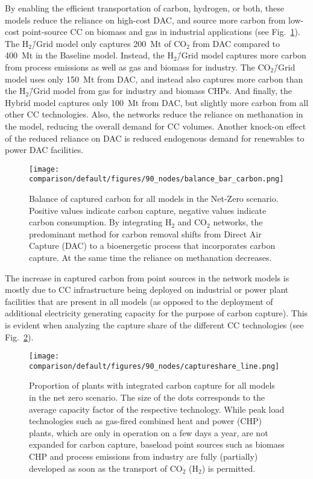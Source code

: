 \documentclass[twocolumn]{article}
\newcommand{\COtwo}{CO$_2$}
\newcommand{\Htwo}{H$_2$}
\newcommand{\modBase}{Baseline model}
\newcommand{\modCO}{CO$_2$\=/Grid model}
\newcommand{\modH}{H$_2$\=/Grid model}
\newcommand{\modHybrid}{Hybrid model}
\begin{document}
By enabling the efficient transportation of carbon, hydrogen, or both, these models reduce the reliance on high-cost DAC, and source more carbon from low-cost point-source CC on biomass and gas in industrial applications (see Fig.~\ref{fig:balance_captured_carbon}). The \modH{} only captures \label{}200~Mt of \COtwo{} from DAC compared to \label{}400~Mt in the \modBase{}. Instead, the \modH{} captures more carbon from process emissions as well as gas and biomass for industry. The \modCO{} uses only \label{}150~Mt from DAC, and instead also captures more carbon than the \modH{} from gas for industry and biomass CHPs. And finally, the \modHybrid{} captures only \label{}100~Mt from DAC, but slightly more carbon from all other CC technologies.
Also, the networks reduce the reliance on methanation in the model, reducing the overall demand for CC volumes. Another knock-on effect of the reduced reliance on DAC is reduced endogenous demand for renewables to power DAC facilities.


\begin{figure}[ht!]
    \centering
    \texttt{[image: comparison/default/figures/90\_nodes/balance\_bar\_carbon.png]}
    \caption{Balance of captured carbon for all models in the Net-Zero scenario. Positive values indicate carbon capture, negative values indicate carbon consumption. By integrating \Htwo{} and \COtwo{} networks, the predominant method for carbon removal shifts from Direct Air Capture (DAC) to a bioenergetic process that incorporates carbon capture. At the same time the reliance on methanation decreases.}
    \label{fig:balance_captured_carbon}
\end{figure}



The increase in captured carbon from point sources in the network models is mostly due to CC infrastructure being deployed on industrial or power plant facilities that are present in all models (as opposed to the deployment of additional electricity generating capacity for the purpose of carbon capture). This is evident when analyzing the capture share of the different CC technologies (see Fig.~\ref{fig:captureshare_line}).


\begin{figure}[h]
    \centering
    \texttt{[image: comparison/default/figures/90\_nodes/captureshare\_line.png]}
    \caption{Proportion of plants with integrated carbon capture for all models in the net zero scenario. The size of the dots corresponds to the average capacity factor of the respective technology. While peak load technologies such as gas-fired combined heat and power (CHP) plants, which are only in operation on a few days a year, are not expanded for carbon capture, baseload point sources such as biomass CHP and process emissions from industry are fully (partially) developed as soon as the transport of \COtwo{} (\Htwo{}) is permitted.}
    \label{fig:captureshare_line}
\end{figure}%
\end{document}
